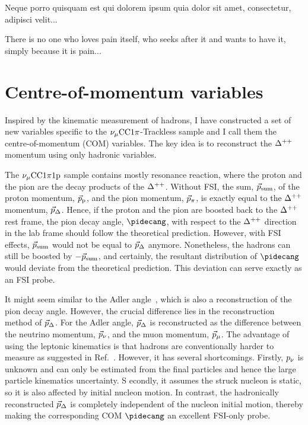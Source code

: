 \begin{savequote}[8cm]
\textlatin{Neque porro quisquam est qui dolorem ipsum quia dolor sit amet, consectetur, adipisci velit...}

There is no one who loves pain itself, who seeks after it and wants to have it, simply because it is pain...
\end{savequote}

\chapter{\label{ch:7-com}Centre-of-momentum variables} 

    Inspired by the kinematic measurement of hadrons, I have constructed a set of new variables specific to the $\nu_{\mu}\textrm{CC}1\pi$-Trackless sample and I call them the centre-of-momentum (COM) variables. 
    The key idea is to reconstruct the $\Delta^{++}$ momentum using only hadronic variables.  

    The $\nu_{\mu}\textrm{CC}1\pi1\textrm{p}$ sample contains mostly resonance reaction, where the proton and the pion are the decay products of the $\Delta^{++}$. 
    Without FSI, the sum, $\vec{p}_{\textrm{sum}}$, of the proton momentum, $\vec{p}_\textrm{p}$, and the pion momentum, $\vec{p}_{\pi}$, is exactly equal to the $\Delta^{++}$ momentum, $\vec{p}_{\Delta}$. 
    Hence, if the proton and the pion are boosted back to the $\Delta^{++}$ rest frame, the pion decay angle, $\pidecang$, with respect to the $\Delta^{++}$ direction in the lab frame should follow the theoretical prediction. 
    However, with FSI effects, $\vec{p}_{\textrm{sum}}$ would not be equal to $\vec{p}_{\Delta}$ anymore. 
    Nonetheless, the hadrons can still be boosted by $-\vec{p}_{\textrm{sum}}$, and certainly, the resultant distribution of $\pidecang$ would deviate from the theoretical prediction. 
    This deviation can serve exactly as an FSI probe. 

    It might seem similar to the Adler angle~\cite{ADLER1968189}, which is also a reconstruction of the pion decay angle. 
    However, the crucial difference lies in the reconstruction method of $\vec{p}_{\Delta}$. For the Adler angle, $\vec{p}_{\Delta}$ is reconstructed as the difference between the neutrino momentum, $\vec{p}_{\nu}$, and the muon momentum, $\vec{p}_{\mu}$. 
    The advantage of using the leptonic kinematics is that hadrons are conventionally harder to measure as suggested in Ref.~\cite{Sanchez:2015yvw}. 
    However, it has several shortcomings. 
    Firstly, $p_{\nu}$ is unknown and can only be estimated from the final particles and hence the large particle kinematics uncertainty. S
    econdly, it assumes the struck nucleon is static, so it is also affected by initial nucleon motion. 
    In contrast, the hadronically reconstructed $\vec{p}_{\Delta}$ is completely independent of the nucleon initial motion, thereby making the corresponding COM $\pidecang$ an excellent FSI-only probe. 

